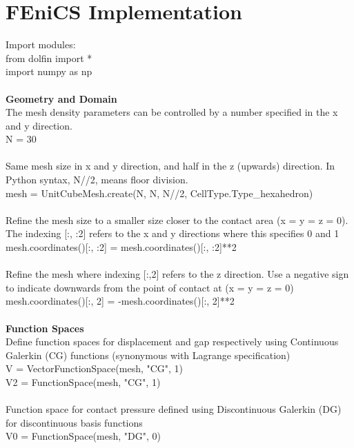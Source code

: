\documentclass[12pt,3p]{article}
\begin{document}
\section{FEniCS Implementation}
Import modules: \\
{\selectfont
from dolfin import *	\\
import numpy as np \\ \\
}
\textbf{Geometry and Domain} \\
The mesh density parameters can be controlled by a number specified in the x and y direction.  \\
{\selectfont
N = 30 \\ \\
}
Same mesh size in x and y direction, and half in the z (upwards) direction. In Python syntax, N//2, means floor division. \\
{\selectfont
mesh = UnitCubeMesh.create(N, N, N//2, CellType.Type\_hexahedron) \\ \\
}
Refine the mesh size to a smaller size closer to the contact area (x = y = z = 0). The indexing [:, :2] refers to the x and y directions where this specifies 0 and 1 \\
{\selectfont
mesh.coordinates()[:, :2] = mesh.coordinates()[:, :2]**2 \\ \\
}
Refine the mesh where indexing [:,2] refers to the z direction. Use a negative sign to indicate downwards from the point of contact at (x = y = z = 0) \\
{\selectfont
mesh.coordinates()[:, 2] = -mesh.coordinates()[:, 2]**2 \\ \\
}
\textbf{Function Spaces} \\ 
Define function spaces for displacement and gap respectively using Continuous Galerkin (CG) functions (synonymous with Lagrange specification)\\ 
{\selectfont
V = VectorFunctionSpace(mesh, "CG", 1) \\
V2 = FunctionSpace(mesh, "CG", 1) \\ \\
}
Function space for contact pressure defined using Discontinuous Galerkin (DG) for discontinuous basis functions \\
{\selectfont
V0 = FunctionSpace(mesh, "DG", 0) \\ \\
}
\end{document}
